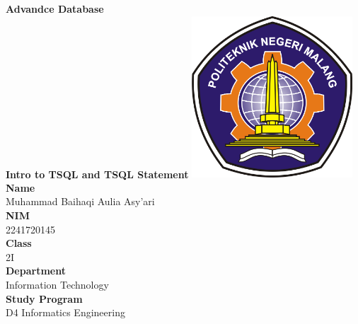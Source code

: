 \documentclass[12pt,titlepage]{article}
\newcommand{\vSubject}{Advandce Database}
\newcommand{\vSubtitle}{Intro to TSQL and TSQL Statement}
\newcommand{\vName}{Muhammad Baihaqi Aulia Asy'ari}
\newcommand{\vNIM}{2241720145}
\newcommand{\vClass}{2I}
\newcommand{\vDepartment}{Information Technology}
\newcommand{\vStudyProgram}{D4 Informatics Engineering}
\begin{document}
\begin{titlepage}
    \centering
    \vfill
    {\bfseries\LARGE
        \vSubject\\
        \vskip0.25cm
        \vSubtitle
    }
    \vfill
    \includegraphics[width=6cm]{images/polinema-logo.png}
    \vfill
    {
        \textbf{Name}\\
        \vName\\
        \vskip0.5cm
        \textbf{NIM}\\
        \vNIM\\
        \vskip0.5cm
        \textbf{Class}\\
        \vClass\\
        \vskip0.5cm
        \textbf{Department}\\
        \vDepartment\\
        \vskip0.5cm
        \textbf{Study Program}\\
        \vStudyProgram
    }
\end{titlepage}

\newpage
\end{document}
